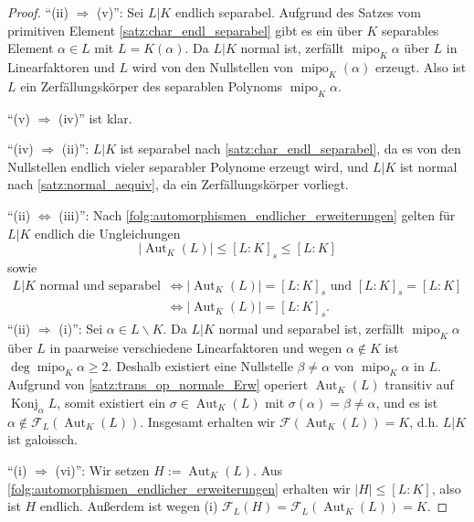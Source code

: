\documentclass[a4paper, twoside, 11pt, ngerman]{report}
\newcommand{\calF}{\mathcal F}
\renewcommand{\setminus}{\smallsetminus}
\DeclareMathOperator{\Aut}{Aut}
\DeclareMathOperator{\Konj}{Konj}
\DeclareMathOperator{\mipo}{mipo}
\theoremstyle{definistyle}
\theoremstyle{remark}
\begin{document}
\begin{proof}
"`(ii) $\Rightarrow$ (v)"': Sei $L|K$ endlich separabel. Aufgrund des Satzes vom primitiven Element \ref{satz:char_endl_separabel} gibt es ein über $K$ separables Element $\alpha \in L$ mit $L = K(\alpha)$.  Da $L|K$ normal ist, zerfällt $\mipo_K \alpha$ über $L$ in Linearfaktoren und $L$ wird von den Nullstellen von $\mipo_K(\alpha)$ erzeugt. Also ist $L$ ein Zerfällungskörper des separablen Polynoms $\mipo_K \alpha$.

"`(v) $\Rightarrow$ (iv)"' ist klar.

"`(iv) $\Rightarrow$ (ii)"': $L|K$ ist separabel nach \ref{satz:char_endl_separabel}, da es von den Nullstellen endlich vieler separabler Polynome erzeugt wird, und $L|K$ ist normal nach \ref{satz:normal_aequiv}, da ein Zerfällungskörper vorliegt.

"`(ii) $\Leftrightarrow$ (iii)"': Nach \ref{folg:automorphismen_endlicher_erweiterungen} gelten für $L|K$ endlich
die Ungleichungen 
\[| \Aut_K(L) | \leq [L : K]_s \leq [L : K]\]
sowie
\begin{align*}
L|K \text{ normal und separabel } &\iff |\Aut_K(L)| = [L : K]_s \text{ und } [L:K]_s = [L : K] \\
& \iff |\Aut_K(L)| = [L : K]_s.
\end{align*}
"`(ii) $\Rightarrow$ (i)"': Sei $\alpha \in L\setminus K$. Da $L|K$ normal und separabel ist, zerfällt $\mipo_K\alpha$
über $L$ in paarweise verschiedene Linearfaktoren und wegen $\alpha\not\in K$ ist $\deg\mipo_K\alpha\geq2$.
Deshalb existiert eine Nullstelle $\beta\neq\alpha$ von $\mipo_K\alpha$ in $L$. Aufgrund von \ref{satz:trans_op_normale_Erw}
operiert $\Aut_K(L)$ transitiv auf $\Konj_\alpha L$, somit existiert ein $\sigma\in\Aut_K(L)$ mit $\sigma(\alpha)=\beta\neq \alpha$, und es ist $\alpha\not\in\calF_L(\Aut_K(L))$. Insgesamt erhalten wir $\calF(\Aut_K(L)) = K$,
d.h. $L|K$ ist galoissch.

"`(i) $\Rightarrow$ (vi)"': Wir setzen $H := \Aut_K(L)$. Aus \ref{folg:automorphismen_endlicher_erweiterungen} erhalten wir $|H| \leq [L : K]$, also ist $H$ endlich. Außerdem ist wegen (i) $\calF_L(H)=\calF_L(\Aut_K(L)) = K$.


\end{proof}
\end{document}
